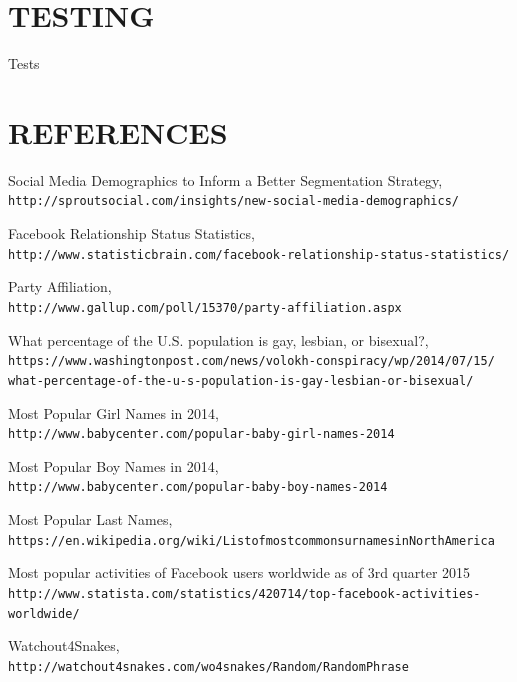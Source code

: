 \documentclass{article}
\begin{document}
\section{TESTING}
Tests

\section*{REFERENCES}

\begin{thebibliography}{99}

Social Media Demographics to Inform a Better Segmentation Strategy,
\\\texttt{http://sproutsocial.com/insights/new-social-media-demographics/}

Facebook Relationship Status Statistics,
\\\texttt{http://www.statisticbrain.com/facebook-relationship-status-statistics/}

Party Affiliation,
\\\texttt{http://www.gallup.com/poll/15370/party-affiliation.aspx}

What percentage of the U.S. population is gay, lesbian, or bisexual?,
\\\texttt{https://www.washingtonpost.com/news/volokh-conspiracy/wp/2014/07/15/
what-percentage-of-the-u-s-population-is-gay-lesbian-or-bisexual/}

Most Popular Girl Names in 2014,
\\\texttt{http://www.babycenter.com/popular-baby-girl-names-2014}

Most Popular Boy Names in 2014,
\\\texttt{http://www.babycenter.com/popular-baby-boy-names-2014}

Most Popular Last Names,
\\\texttt{https://en.wikipedia.org/wiki/ListofmostcommonsurnamesinNorthAmerica}

Most popular activities of Facebook users worldwide as of 3rd quarter 2015
\\\texttt{http://www.statista.com/statistics/420714/top-facebook-activities-worldwide/}

Watchout4Snakes,
\\\texttt{http://watchout4snakes.com/wo4snakes/Random/RandomPhrase}

\end{thebibliography}
\end{document}
